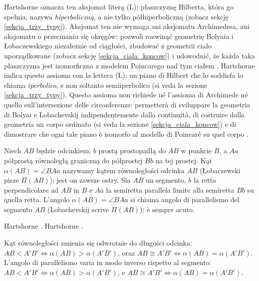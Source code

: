 Hartshorne \cite[s. 374]{hartshorne_2000} oznacza ten aksjomat literą (L); płaszczyznę Hilberta, która go spełnia, nazywa \emph{hiperboliczną}, a nie tylko półhiperboliczną (zobacz sekcję \ref{sekcja_trzy_typy}). %
Aksjomat ten nie wymaga ani aksjomatu Archimedesa, ani aksjomatu o przecinaniu się okręgów: pozwoli rozwinąć geometrię Bolyaia i Łobaczewskiego niezależnie od ciągłości, zbudować z geometrii ciało uporządkowane (zobacz sekcję \ref{sekcja_ciala_koncow}) i udowodnić, że każda taka płaszczyzna jest izomorficzna z modelem Poincarego nad tym ciałem \cite[s. 373--374]{hartshorne_2000}. %
Hartshorne \cite[p. 374]{hartshorne_2000} indica questo assioma con la lettera (L); un piano di Hilbert che lo soddisfa lo chiama \emph{iperbolico}, e non soltanto semiiperbolico (si veda la sezione \ref{sekcja_trzy_typy}). %
Questo assioma non richiede né l'assioma di Archimede né quello sull'intersezione delle circonferenze: permetterà di sviluppare la geometria di Bolyai e Lobachevskij indipendentemente dalla continuità, di costruire dalla geometria un corpo ordinato (si veda la sezione \ref{sekcja_ciala_koncow}) e di dimostrare che ogni tale piano è isomorfo al modello di Poincaré su quel corpo \cite[p. 373--374]{hartshorne_2000}. %

\begin{definition}
[kąt równoległości] %
[angolo di parallelismo] %
	Niech $AB$ będzie odcinkiem, $b$ prostą prostopadłą do $AB$ w punkcie $B$, a $Aa$ półprostą równoległą graniczną do półprostej $Bb$ na tej prostej. %
	Kąt $\alpha(AB) = \angle BAa$ nazywamy kątem równoległości odcinka $AB$ (Łobaczewski pisze $\Pi(AB)$); jest on zawsze ostry. %
	Sia $AB$ un segmento, $b$ la retta perpendicolare ad $AB$ in $B$ e $Aa$ la semiretta parallela limite alla semiretta $Bb$ su quella retta. %
	L'angolo $\alpha(AB) = \angle BAa$ si chiama angolo di parallelismo del segmento $AB$ (Lobachevskij scrive $\Pi(AB)$); è sempre acuto. %
\end{definition}

Hartshorne \cite[s. 374--375]{hartshorne_2000}. %
Hartshorne \cite[p. 374--375]{hartshorne_2000}. %

\begin{proposition}
	Kąt równoległości zmienia się odwrotnie do długości odcinka: $AB < A'B' \Leftrightarrow \alpha(AB) > \alpha(A'B')$, oraz $AB \cong A'B' \Leftrightarrow \alpha(AB) = \alpha(A'B')$. %
	L'angolo di parallelismo varia in modo inverso rispetto al segmento: $AB < A'B' \Leftrightarrow \alpha(AB) > \alpha(A'B')$, e $AB \cong A'B' \Leftrightarrow \alpha(AB) = \alpha(A'B')$. %
\end{proposition}


